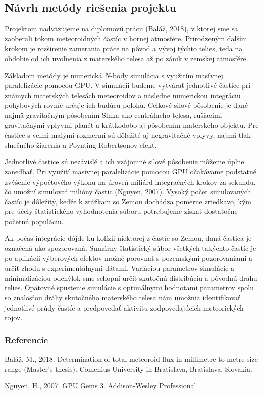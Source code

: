 \subsection{Návrh metódy riešenia
projektu}\label{nuxe1vrh-metuxf3dy-rieux161enia-projektu}

Projektom nadväzujeme na diplomovú prácu (Baláž, 2018), v ktorej sme sa
zaoberali tokom meteoroidných častíc v hornej atmosfére. Prirodzeným
ďalším krokom je rozšírenie zamerania práce na pôvod a vývoj týchto
telies, teda na obdobie od ich uvoľnenia z materského telesa až po zánik
v zemskej atmosfére.

Základom metódy je numerická \(N\)-body simulácia s využitím masívnej
paralelizácie pomocou GPU. V simulácii budeme vytvárať jednotlivé
častice pri známych materských telesách meteoroidov a následne
numerickou integráciu pohybových rovníc určuje ich budúcu polohu.
Celkové silové pôsobenie je dané najmä gravitačným pôsobením Slnka ako
centrálneho telesa, rušiacimi gravitačnými vplyvmi planét a krátkodobo
aj pôsobením materského objektu. Pre častice s veľmi malými rozmermi sú
dôležité aj negravitačné vplyvy, najmä tlak slnečného žiarenia a
Poynting-Robertsonov efekt.

Jednotlivé častice sú nezávislé a ich vzájomné silové pôsobenie môžeme
úplne zanedbať. Pri využití masívnej paralelizácie pomocou GPU očakávame
podstatné zvýšenie výpočtového výkonu na úroveň miliárd integračných
krokov za sekundu, čo umožní simulovať milióny častíc (Nguyen, 2007).
Vysoký počet simulovaných častíc je dôležitý, keďže k zrážkam so Zemou
dochádza pomerne zriedkavo, kým pre účely štatistického vyhodnotenia
súboru potrebujeme získať dostatočne početnú populáciu.

Ak počas integrácie dôjde ku kolízii niektorej z častíc so Zemou, daná
častica je označená ako spozorovaná. Sumárny štatistický súbor všetkých
takýchto častíc je po aplikácii výberových efektov možné porovnať s
pozemskými pozorovaniami a určiť zhodu s experimentálnymi dátami.
Variáciou parametrov simulácie a minimalizáciou odchýlok sme schopní
určiť skutočnú distribúciu a pôvodnú dráhu telies. Opätovné spustenie
simulácie s optimálnymi hodnotami parametrov spolu so znalosťou dráhy
skutočného materského telesa nám umožnia identifikovať jednotlivé prúdy
častíc a predpovedať aktivitu zodpovedajúcich meteorických rojov.

\subsubsection*{Referencie}\label{referencie}

\hypertarget{refs}{}
\hypertarget{ref-balaz2018}{}
Baláž, M., 2018. Determination of total meteoroid flux in millimetre to
metre size range (Master's thesis). Comenius University in Bratislava,
Bratislava, Slovakia.

\hypertarget{ref-nguyen2007}{}
Nguyen, H., 2007. GPU Gems 3. Addison-Wesley Professional.
